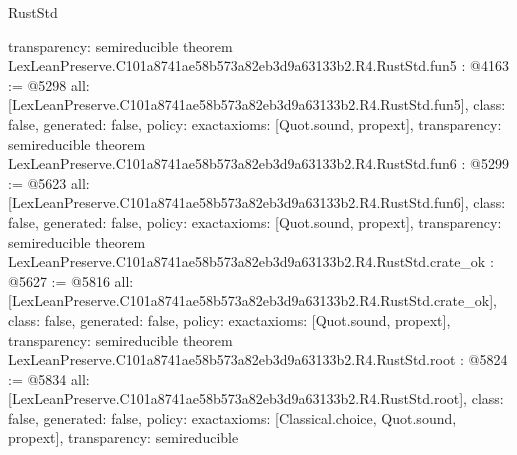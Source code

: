 \begin{lexlean}{RustStd}
\begin{coremodule}
{  transparency: semireducible
}
theorem LexLeanPreserve.C101a8741ae58b573a82eb3d9a63133b2.R4.RustStd.fun5 : @4163 := @5298 {
  all: [LexLeanPreserve.C101a8741ae58b573a82eb3d9a63133b2.R4.RustStd.fun5],
  class: false,
  generated: false,
  policy: exact{axioms: [Quot.sound, propext]},
  transparency: semireducible
}
theorem LexLeanPreserve.C101a8741ae58b573a82eb3d9a63133b2.R4.RustStd.fun6 : @5299 := @5623 {
  all: [LexLeanPreserve.C101a8741ae58b573a82eb3d9a63133b2.R4.RustStd.fun6],
  class: false,
  generated: false,
  policy: exact{axioms: [Quot.sound, propext]},
  transparency: semireducible
}
theorem LexLeanPreserve.C101a8741ae58b573a82eb3d9a63133b2.R4.RustStd.crate_ok : @5627 := @5816 {
  all: [LexLeanPreserve.C101a8741ae58b573a82eb3d9a63133b2.R4.RustStd.crate_ok],
  class: false,
  generated: false,
  policy: exact{axioms: [Quot.sound, propext]},
  transparency: semireducible
}
theorem LexLeanPreserve.C101a8741ae58b573a82eb3d9a63133b2.R4.RustStd.root : @5824 := @5834 {
  all: [LexLeanPreserve.C101a8741ae58b573a82eb3d9a63133b2.R4.RustStd.root],
  class: false,
  generated: false,
  policy: exact{axioms: [Classical.choice, Quot.sound, propext]},
  transparency: semireducible
}


\end{coremodule}
\end{lexlean}
